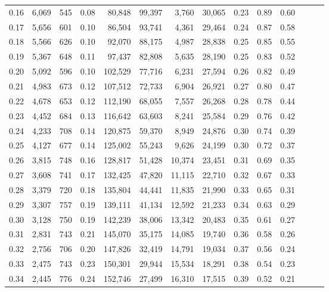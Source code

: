 \begin{tabular}{rrrrrrrrrrrrrr}
0.16 &  6,069 &  545 &  0.08 &   80,848 &   99,397 &   3,760 &  30,065 &  0.23 &  0.89 &      0.60 \\
0.17 &  5,656 &  601 &  0.10 &   86,504 &   93,741 &   4,361 &  29,464 &  0.24 &  0.87 &      0.58 \\
0.18 &  5,566 &  626 &  0.10 &   92,070 &   88,175 &   4,987 &  28,838 &  0.25 &  0.85 &      0.55 \\
0.19 &  5,367 &  648 &  0.11 &   97,437 &   82,808 &   5,635 &  28,190 &  0.25 &  0.83 &      0.52 \\
0.20 &  5,092 &  596 &  0.10 &  102,529 &   77,716 &   6,231 &  27,594 &  0.26 &  0.82 &      0.49 \\
0.21 &  4,983 &  673 &  0.12 &  107,512 &   72,733 &   6,904 &  26,921 &  0.27 &  0.80 &      0.47 \\
0.22 &  4,678 &  653 &  0.12 &  112,190 &   68,055 &   7,557 &  26,268 &  0.28 &  0.78 &      0.44 \\
0.23 &  4,452 &  684 &  0.13 &  116,642 &   63,603 &   8,241 &  25,584 &  0.29 &  0.76 &      0.42 \\
0.24 &  4,233 &  708 &  0.14 &  120,875 &   59,370 &   8,949 &  24,876 &  0.30 &  0.74 &      0.39 \\
0.25 &  4,127 &  677 &  0.14 &  125,002 &   55,243 &   9,626 &  24,199 &  0.30 &  0.72 &      0.37 \\
0.26 &  3,815 &  748 &  0.16 &  128,817 &   51,428 &  10,374 &  23,451 &  0.31 &  0.69 &      0.35 \\
0.27 &  3,608 &  741 &  0.17 &  132,425 &   47,820 &  11,115 &  22,710 &  0.32 &  0.67 &      0.33 \\
0.28 &  3,379 &  720 &  0.18 &  135,804 &   44,441 &  11,835 &  21,990 &  0.33 &  0.65 &      0.31 \\
0.29 &  3,307 &  757 &  0.19 &  139,111 &   41,134 &  12,592 &  21,233 &  0.34 &  0.63 &      0.29 \\
0.30 &  3,128 &  750 &  0.19 &  142,239 &   38,006 &  13,342 &  20,483 &  0.35 &  0.61 &      0.27 \\
0.31 &  2,831 &  743 &  0.21 &  145,070 &   35,175 &  14,085 &  19,740 &  0.36 &  0.58 &      0.26 \\
0.32 &  2,756 &  706 &  0.20 &  147,826 &   32,419 &  14,791 &  19,034 &  0.37 &  0.56 &      0.24 \\
0.33 &  2,475 &  743 &  0.23 &  150,301 &   29,944 &  15,534 &  18,291 &  0.38 &  0.54 &      0.23 \\
0.34 &  2,445 &  776 &  0.24 &  152,746 &   27,499 &  16,310 &  17,515 &  0.39 &  0.52 &      0.21 \\

\end{tabular}
